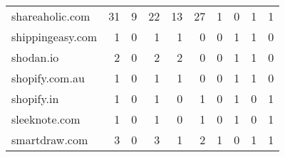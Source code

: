 \begin{tabular}{lrrrrrrrrr}
            shareaholic.com &                               31 &                                  9 &                                     22 &                           13 &                          27 &                                   1 &                                      0 &                             1 &                            1 \\
           shippingeasy.com &                                1 &                                  0 &                                      1 &                            1 &                           0 &                                   0 &                                      1 &                             1 &                            0 \\
                  shodan.io &                                2 &                                  0 &                                      2 &                            2 &                           0 &                                   0 &                                      1 &                             1 &                            0 \\
             shopify.com.au &                                1 &                                  0 &                                      1 &                            1 &                           0 &                                   0 &                                      1 &                             1 &                            0 \\
                 shopify.in &                                1 &                                  0 &                                      1 &                            0 &                           1 &                                   0 &                                      1 &                             0 &                            1 \\
              sleeknote.com &                                1 &                                  0 &                                      1 &                            0 &                           1 &                                   0 &                                      1 &                             0 &                            1 \\
              smartdraw.com &                                3 &                                  0 &                                      3 &                            1 &                           2 &                                   1 &                                      0 &                             1 &                            1 \\

\end{tabular}
